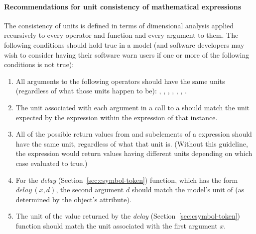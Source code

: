 \paragraph{Recommendations for unit consistency of mathematical expressions}

The consistency of units is defined in terms of dimensional
analysis applied recursively to every operator and function and
every argument to them.  The following conditions should hold true
in a model (and software developers may wish to consider having
their software warn users if one or more of the following
conditions is not true):

\begin{enumerate}

\item All arguments to the following operators should have the same
  units (regardless of what those units happen to be):
  , , ,  ,
  , , .

\item The unit associated with each argument in a call to a
  \FunctionDefinition should match the unit expected by the
   expression within the  expression of
  that \FunctionDefinition instance.


\item All of the possible return values from  and
   subelements of a  expression
  should have the same unit, regardless of what that unit is.
  (Without this guideline, the  expression would
  return values having different units depending on which case
  evaluated to true.)

\item For the \emph{delay} 
  (Section~\ref{sec:csymbol-token}) function, which has the form
  $\textit{delay}\,(x, d)$, the second argument $d$ should match
  the model's unit of  (as determined by the \Model
  object's  attribute).

\item The unit of the value returned by the \emph{delay}
   (Section~\ref{sec:csymbol-token}) function
  should match the unit associated with the first argument $x$.



\end{enumerate}

